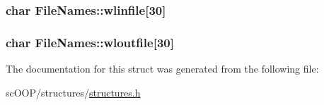\hypertarget{struct_file_names_af41fd595b79047dfee97d3a66aa7ef40}{
\subsubsection[{wlinfile}]{\setlength{\rightskip}{0pt plus 5cm}char File\+Names\+::wlinfile\mbox{[}30\mbox{]}}}\label{struct_file_names_af41fd595b79047dfee97d3a66aa7ef40}
\hypertarget{struct_file_names_ad3186b4b1d3a03d1cce61385475df1a9}{
\subsubsection[{wloutfile}]{\setlength{\rightskip}{0pt plus 5cm}char File\+Names\+::wloutfile\mbox{[}30\mbox{]}}}\label{struct_file_names_ad3186b4b1d3a03d1cce61385475df1a9}


The documentation for this struct was generated from the following file\+:\begin{DoxyCompactItemize}
\item 
sc\+O\+O\+P/structures/\hyperlink{structures_8h}{structures.\+h}\end{DoxyCompactItemize}
